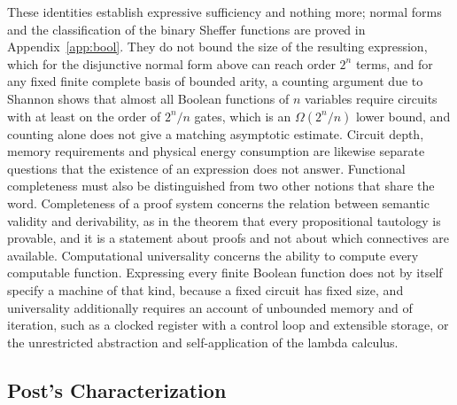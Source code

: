 \documentclass[11pt]{article}
\theoremstyle{definition}
\theoremstyle{remark}
\begin{document}
These identities establish expressive sufficiency and nothing more; normal forms and the classification of the binary Sheffer functions are proved in Appendix~\ref{app:bool}. They do not bound the size of the resulting expression, which for the disjunctive normal form above can reach order $2^{n}$ terms, and for any fixed finite complete basis of bounded arity, a counting argument due to Shannon \cite{shannon1949} shows that almost all Boolean functions of $n$ variables require circuits with at least on the order of $2^{n}/n$ gates, which is an $\Omega(2^{n}/n)$ lower bound, and counting alone does not give a matching asymptotic estimate. Circuit depth, memory requirements and physical energy consumption are likewise separate questions that the existence of an expression does not answer. Functional completeness must also be distinguished from two other notions that share the word. Completeness of a proof system concerns the relation between semantic validity and derivability, as in the theorem that every propositional tautology is provable, and it is a statement about proofs and not about which connectives are available. Computational universality concerns the ability to compute every computable function. Expressing every finite Boolean function does not by itself specify a machine of that kind, because a fixed circuit has fixed size, and universality additionally requires an account of unbounded memory and of iteration, such as a clocked register with a control loop and extensible storage, or the unrestricted abstraction and self-application of the lambda calculus.

\subsection{Post's Characterization}
\end{document}
